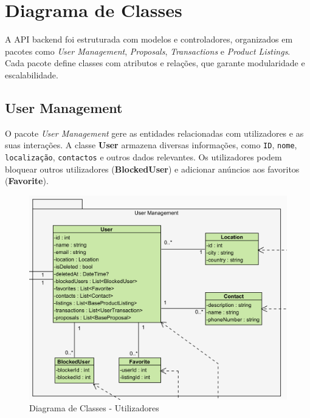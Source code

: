 \documentclass[a4paper, 12pt]{article} %
\begin{document}
\section{Diagrama de Classes}

A API backend foi estruturada com modelos e controladores, organizados em pacotes como \textit{User Management}, \textit{Proposals}, \textit{Transactions} e \textit{Product Listings}. Cada pacote define classes com atributos e relações, que garante modularidade e escalabilidade.

\subsection{User Management}
O pacote \textit{User Management} gere as entidades relacionadas com utilizadores e as suas interações. A classe \textbf{User} armazena diversas informações, como \verb*|ID|, \verb*|nome|, \verb*|localização|, \verb*|contactos| e outros dados relevantes. Os utilizadores podem bloquear outros utilizadores (\textbf{BlockedUser}) e adicionar anúncios aos favoritos (\textbf{Favorite}).

\begin{figure}[ht]
	\centering
	\includegraphics[width=\textwidth]{../images/class-diagram-user-management.png}
	\caption{Diagrama de Classes - Utilizadores}
	\label{fig:class_diagram_user_management}
\end{figure}
\end{document}
